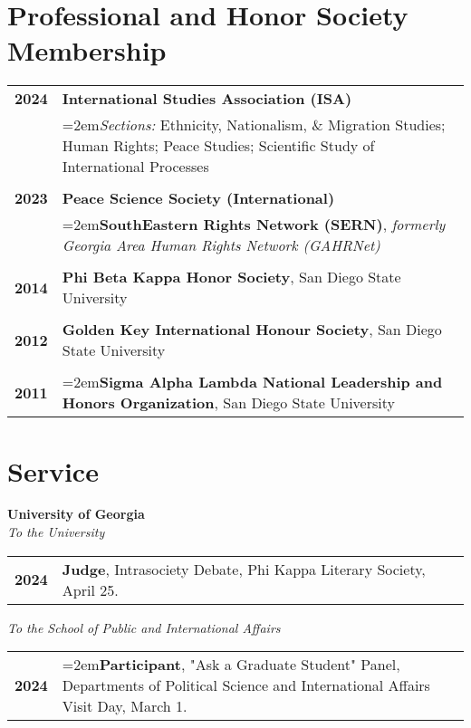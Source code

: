 \documentclass[letterpaper,12pt]{article}
\begin{document}
\section{Professional and Honor Society Membership}
\begin{xltabular}{\dimexpr\textwidth-0in}{p{.85in}X}
\textbf{2024} &  \textbf{International Studies Association (ISA)}\\
                     &  \hangindent=2em\textit{Sections:} Ethnicity, Nationalism, \& Migration Studies; Human Rights; Peace Studies; \mbox{Scientific} Study of International Processes\\ \\
\textbf{2023} &  \textbf{Peace Science Society (International)}\\
                     & \hangindent=2em\textbf{SouthEastern Rights Network (SERN)}, \textit{formerly Georgia Area Human Rights Network (GAHRNet)}\\ \\
\textbf{2014} &  \textbf{Phi Beta Kappa Honor Society}, San Diego State University\\ \\
\textbf{2012} &  \textbf{Golden Key International Honour Society}, San Diego State University\\ \\
\textbf{2011} &  \hangindent=2em\textbf{Sigma Alpha Lambda National Leadership and Honors Organization}, San Diego State University
\end{xltabular}

%

\section{Service}
\textbf{University of Georgia}\\
\textit{To the University}
\begin{xltabular}{\dimexpr\textwidth-0in}{p{.85in}X}
\textbf{2024} &  \textbf{Judge}, Intrasociety Debate, Phi Kappa Literary Society, April 25.
\end{xltabular}
\par
\textit{To the School of Public and International Affairs}
\begin{xltabular}{\dimexpr\textwidth-0in}{p{.85in}X}
\textbf{2024} &  \hangindent=2em\textbf{Participant}, "Ask a Graduate Student" Panel, Departments of Political Science and \mbox{International} Affairs Visit Day, March 1.
\end{xltabular}
\end{document}
